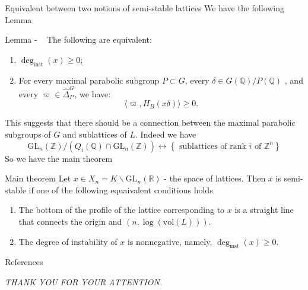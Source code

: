 \documentclass[pdf]{beamer}
\newcommand\Mycite[1]{%
  \citeauthor{#1}~}
\begin{document}
\begin{frame}{Equivalent between two notions of semi-stable lattices}
    We have the following Lemma
    \begin{block}{Lemma - \Mycite{chaudouard2016variante}}
        The following are equivalent:
        \begin{enumerate}
            \item \(\deg_{\text{inst}}(x) \geq 0\);
            \item For every maximal parabolic subgroup \( P \subset G \), every \( \delta \in  G(\mathbb{Q})/P(\mathbb{Q})\) , and every \( \varpi \in \hat{\Delta}_P^G \), we have:
                  \[
                      \langle \varpi, H_B(x\delta ) \rangle \geq 0.
                  \]
        \end{enumerate}
    \end{block}
\end{frame}


\begin{frame}
    This suggests that there should be a connection between the maximal parabolic subgroups of $G$
    and sublattices of $L$. Indeed we have
    \[ \text{GL}_n(\mathbb{Z})/(Q_i(\mathbb{Q}) \cap \text{GL}_n(\mathbb{Z})) \longleftrightarrow \left\lbrace \text{ sublattices of rank $i$ of $\mathbb{Z}^n$}\right\rbrace\]
    \pause
    So we have the main theorem
    \begin{block}{Main theorem}
        Let $x \in X_n = K \backslash \text{GL}_n(\mathbb{R})$ - the space of lattices. Then $x$ is semi-stable if one of the following equaivalent
        conditions holds
        \begin{enumerate}
            \item The bottom of the profile of the lattice corresponding to $x$ is a straight line that connects the origin and $(n,\log(\text{vol}(L)))$.
            \item The degree of instability of $x$ is nonnegative, namely, $\deg_{\text{inst}}(x) \ge 0$.
        \end{enumerate}
    \end{block}

\end{frame}
\begin{frame}{References}

\end{frame}

\begin{frame}
    \begin{center}
        \textit{THANK YOU FOR YOUR ATTENTION.}
    \end{center}
\end{frame}
\end{document}
